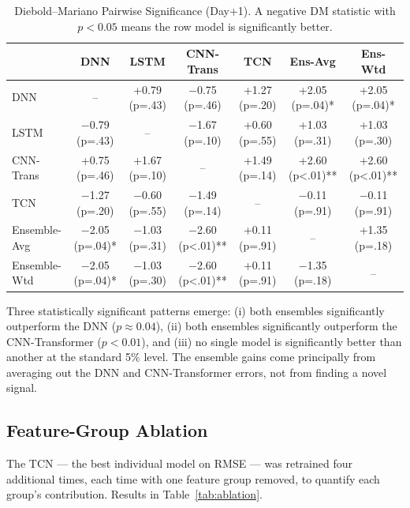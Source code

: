 \documentclass[12pt]{article}
\begin{document}
\begin{table}[h!]
\centering
\footnotesize
\caption{Diebold--Mariano Pairwise Significance (Day+1). A negative DM statistic with $p<0.05$ means the row model is significantly better.}
\label{tab:dm}
\begin{tabular}{@{}lcccccc@{}}
\toprule
 & \textbf{DNN} & \textbf{LSTM} & \textbf{CNN-Trans} & \textbf{TCN} & \textbf{Ens-Avg} & \textbf{Ens-Wtd} \\
\midrule
DNN        & --              & +0.79 (p=.43) & $-$0.75 (p=.46) & +1.27 (p=.20) & +2.05 (p=.04)* & +2.05 (p=.04)* \\
LSTM       & $-$0.79 (p=.43) & --            & $-$1.67 (p=.10) & +0.60 (p=.55) & +1.03 (p=.31) & +1.03 (p=.30) \\
CNN-Trans  & +0.75 (p=.46)   & +1.67 (p=.10) & --              & +1.49 (p=.14) & +2.60 (p<.01)** & +2.60 (p<.01)** \\
TCN        & $-$1.27 (p=.20) & $-$0.60 (p=.55) & $-$1.49 (p=.14) & --          & $-$0.11 (p=.91) & $-$0.11 (p=.91) \\
Ensemble-Avg & $-$2.05 (p=.04)* & $-$1.03 (p=.31) & $-$2.60 (p<.01)** & +0.11 (p=.91) & --           & +1.35 (p=.18) \\
Ensemble-Wtd & $-$2.05 (p=.04)* & $-$1.03 (p=.30) & $-$2.60 (p<.01)** & +0.11 (p=.91) & $-$1.35 (p=.18) & -- \\
\bottomrule
\end{tabular}
\end{table}

Three statistically significant patterns emerge: (i) both ensembles significantly outperform the DNN ($p \approx 0.04$), (ii) both ensembles significantly outperform the CNN-Transformer ($p < 0.01$), and (iii) no single model is significantly better than another at the standard 5\% level. The ensemble gains come principally from averaging out the DNN and CNN-Transformer errors, not from finding a novel signal.

\subsection{Feature-Group Ablation}

The TCN --- the best individual model on RMSE --- was retrained four additional times, each time with one feature group removed, to quantify each group's contribution. Results in Table~\ref{tab:ablation}.
\end{document}
